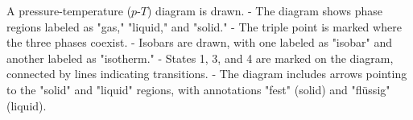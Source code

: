 A pressure-temperature (\( p \)-\( T \)) diagram is drawn.  
- The diagram shows phase regions labeled as "gas," "liquid," and "solid."  
- The triple point is marked where the three phases coexist.  
- Isobars are drawn, with one labeled as "isobar" and another labeled as "isotherm."  
- States 1, 3, and 4 are marked on the diagram, connected by lines indicating transitions.  
- The diagram includes arrows pointing to the "solid" and "liquid" regions, with annotations "fest" (solid) and "flüssig" (liquid).